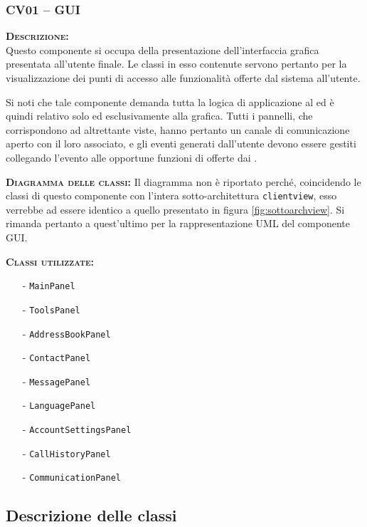\subsubsection{CV01 -- GUI}\label{sec:gui}
\begin{description}
	\item{\scshape\bfseries Descrizione:}\\
Questo componente si occupa della presentazione dell'interfaccia grafica presentata all'utente finale. Le classi in esso contenute servono pertanto per la visualizzazione dei punti di accesso alle funzionalità offerte dal sistema all'utente.

Si noti che tale componente demanda tutta la logica di applicazione al  ed è quindi relativo solo ed esclusivamente alla grafica. Tutti i pannelli, che corrispondono ad altrettante viste, hanno pertanto un canale di comunicazione aperto con il  loro associato, e gli eventi generati dall'utente devono essere gestiti collegando l'evento alle opportune funzioni di  offerte dai .

	\item{\scshape\bfseries Diagramma delle classi:}
Il diagramma non è riportato perché, coincidendo le classi di questo componente con l'intera sotto-architettura \texttt{clientview}, esso verrebbe ad essere identico a quello presentato in figura \vref{fig:sottoarchview}. Si rimanda pertanto a quest'ultimo per la rappresentazione UML del componente GUI\@.
	
	\item{\scshape\bfseries Classi utilizzate:} 
	\begin{itemize}[noitemsep,nolistsep]
		\item[-] \texttt{MainPanel}
		\item[-] \texttt{ToolsPanel}
		\item[-] \texttt{AddressBookPanel}
		\item[-] \texttt{ContactPanel}
		\item[-] \texttt{MessagePanel}
		\item[-] \texttt{LanguagePanel}
		\item[-] \texttt{AccountSettingsPanel}
		\item[-] \texttt{CallHistoryPanel}
		\item[-] \texttt{CommunicationPanel}
	\end{itemize}  
\end{description}

\subsection{Descrizione delle classi}

